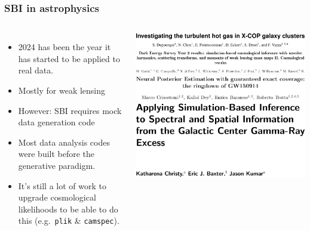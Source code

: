 \documentclass[aspectratio=169]{beamer}
\begin{document}
\begin{frame}
    \frametitle{SBI in astrophysics}
    \begin{columns}
        \begin{itemize}
            \item 2024 has been the year it has started to be applied to real data.
            \item Mostly for weak lensing
            \item However: SBI requires mock data generation code
            \item Most data analysis codes were built before the generative paradigm.
            \item It's still a lot of work to upgrade cosmological likelihoods  to be able to do this (e.g.\ \texttt{plik} \& \texttt{camspec}).
        \end{itemize}
        \includegraphics[width=\textwidth]{figures/sbi_papers/clusters.pdf}
        \vspace{10pt}\\
        \includegraphics[width=\textwidth]{figures/sbi_papers/des.pdf}
        \vspace{10pt}\\
        \includegraphics[width=\textwidth]{figures/sbi_papers/gw.pdf}
        \vspace{10pt}\\
        \includegraphics[width=\textwidth]{figures/sbi_papers/center.pdf}

\end{columns}
\end{frame}
\end{document}
